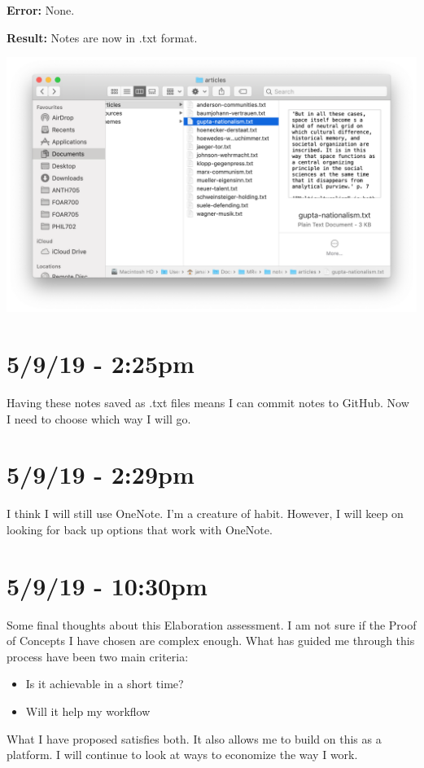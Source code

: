 \documentclass{article}
\begin{document}
\textbf{Error:} None.

\textbf{Result:} Notes are now in .txt format.

\includegraphics[width=\textwidth]{text.png}

\section*{5/9/19 - 2:25pm}

Having these notes saved as .txt files means I can commit notes to GitHub. Now I need to choose which way I will go.

\section*{5/9/19 - 2:29pm}

I think I will still use OneNote. I'm a creature of habit. However, I will keep on looking for back up options that work with OneNote.

\section*{5/9/19 - 10:30pm}

Some final thoughts about this Elaboration assessment. I am not sure if the Proof of Concepts I have chosen are complex enough. What has guided me through this process have been two main criteria:
\begin{itemize}
    \item Is it achievable in a short time?
    \item Will it help my workflow
\end{itemize}

What I have proposed satisfies both. It also allows me to build on this as a platform. I will continue to look at ways to economize the way I work.
\end{document}
